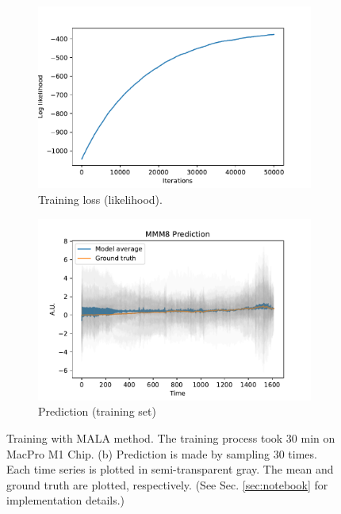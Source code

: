 \documentclass{article}
\begin{document}
\begin{figure}[h]
    \centering
    \begin{subfigure}[b]{0.5\textwidth}
        \centering
        \includegraphics[width=\textwidth]{../img/training_MALA_50000-iter.pdf}
        \caption{Training loss (likelihood).}
        \label{fig:training-log}
    \end{subfigure}%
    \begin{subfigure}[b]{0.5\textwidth}
        \centering
        \includegraphics[width=\textwidth]{../img/prediction_MALA_50000-iter.pdf}
        \caption{Prediction (training set)}
        \label{fig:pred-sub}
    \end{subfigure}
    \caption{Training with MALA method\citep{roberts1998optimal}. The training process took $30$ min on MacPro M1 Chip. (b) Prediction is made by sampling $30$ times. Each time series is plotted in semi-transparent gray. The mean and ground truth are plotted, respectively. (See Sec. \ref{sec:notebook} for implementation details.)}
    \label{fig:pred}
\end{figure}
\end{document}
